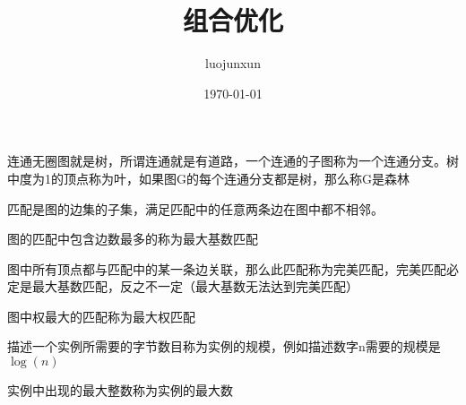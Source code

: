 \documentclass[12pt, a4paper, oneside]{ctexart}
\title{\huge\textbf{组合优化}}
\author{luojunxun}
\date{\today}
\begin{document}
\maketitle



连通无圈图就是树，所谓连通就是有道路，一个连通的子图称为一个连通分支。树中度为1的顶点称为叶，如果图G的每个连通分支都是树，那么称G是森林

匹配是图的边集的子集，满足匹配中的任意两条边在图中都不相邻。

图的匹配中包含边数最多的称为最大基数匹配

图中所有顶点都与匹配中的某一条边关联，那么此匹配称为完美匹配，完美匹配必定是最大基数匹配，反之不一定（最大基数无法达到完美匹配）

图中权最大的匹配称为最大权匹配


描述一个实例所需要的字节数目称为实例的规模，例如描述数字n需要的规模是$\log(n)$

实例中出现的最大整数称为实例的最大数
\end{document}
